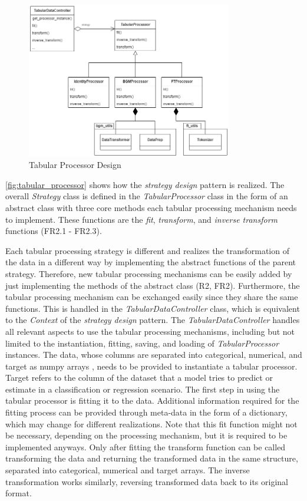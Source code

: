 \begin{figure}[h]
	\centering
	\includegraphics[width=0.8\textwidth]{images/tabular_processor.png}
	\caption[Tabular Processor Design]{Tabular Processor Design}
	\label{fig:tabular_processor}
\end{figure}

\autoref{fig:tabular_processor} shows how the \textit{strategy design} pattern is realized.
The overall \textit{Strategy} class is defined in the \textit{TabularProcessor} class in the form of an abstract class with three core methods each tabular processing mechanism needs to implement.
These functions are the \textit{fit}, \textit{transform}, and \textit{inverse transform} functions (FR2.1 - FR2.3).

Each tabular processing strategy is different and realizes the transformation of the data in a different way by implementing the abstract functions of the parent strategy.
Therefore, new tabular processing mechanisms can be easily added by just implementing the methods of the abstract class (R2, FR2).
Furthermore, the tabular processing mechanism can be exchanged easily since they share the same functions.
This is handled in the \textit{TabularDataController} class, which is equivalent to the \textit{Context} of the \textit{strategy design} pattern.
The \textit{TabularDataController} handles all relevant aspects to use the tabular processing mechanisms, including but not limited to the instantiation, fitting, saving, and loading of \textit{TabularProcessor} instances.
The data, whose columns are separated into categorical, numerical, and target as numpy arrays \cite{harris2020array}, needs to be provided to instantiate a tabular processor.
Target refers to the column of the dataset that a model tries to predict or estimate in a classification or regression scenario.
The first step in using the tabular processor is fitting it to the data.
Additional information required for the fitting process can be provided through meta-data in the form of a dictionary, which may change for different realizations.
Note that this fit function might not be necessary, depending on the processing mechanism, but it is required to be implemented anyways.
Only after fitting the transform function can be called transforming the data and returning the transformed data in the same structure, \ie separated into categorical, numerical and target arrays.
The inverse transformation works similarly, reversing transformed data back to its original format.



